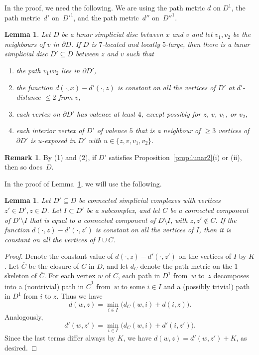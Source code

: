 \documentclass[a4paper,12pt,leqno]{amsart}
\newtheorem{lemma}[thm]{Lemma}
\theoremstyle{definition}
\newtheorem{remark}[thm]{Remark}
\begin{document}
In the proof, we need the following.  We are using the path metric $d$ on $D^{1}$, the path metric~$d'$ on~$D'^1$, and the path metric~$d''$ on~$D''^1$.

\begin{lemma} \label{lem:nice lunar diagram}
Let $D$ be a lunar simplicial disc between $x$ and $v$ and let $v_1,v_2$ be the neighbours of $v$ in $\partial D$. If $D$ is $7$-located and locally $5$-large, then there is a lunar simplicial disc $D'\subseteq D$ between $z$ and $v$ such that 
    \begin{enumerate}
          \item the path $v_1vv_2$ lies in $\partial D'$,
          \item the function $d(\cdot,x)-d'(\cdot,z)$ is constant on all the vertices of $D'$ at $d'$-distance $\leq 2$ from $v$,
        \item each vertex on $\partial D'$ has valence at least $4$, except possibly for $z$, $v$, 
        $v_1$, or $v_2$, 
               \item each interior vertex of $D'$ of valence $5$ that is a neighbour of $\geq 3$ vertices of~$\partial D'$ is $u$-exposed in $D'$ with $u\in \{z,v,v_1,v_2\}$.
     \end{enumerate}  
\end{lemma}

\begin{remark}
\label{rem:polite}
By (1) and (2), if $D'$ satisfies Proposition~\ref{prop:lunar2}(i) or (ii), then so does~$D$.
\end{remark}

In the proof of Lemma~\ref{lem:nice lunar diagram}, we will use the following.

\begin{lemma}
\label{rem:cut}
Let $D'\subseteq D$ be connected simplicial complexes with vertices $z'\in D',z\in D$. Let $I\subset D'$ be a subcomplex, and let $C$ be a connected component of $D'\setminus I$ that is equal to a connected component of $D\setminus I$, with $z,z'\notin C$. If the function $d(\cdot,z)-d'(\cdot,z')$ is constant on all the vertices of $I$, then it is constant on all the vertices of $I\cup C$. 
\end{lemma}
\begin{proof}
Denote the constant value of $d(\cdot,z)-d'(\cdot,z')$ on the vertices of $I$ by $K$. Let $\overline C$ be the closure of $C$ in $D$, and let $d_C$ denote the path metric on the $1$-skeleton of $\overline C$.
For each vertex $w$ of $C$, each path in $D^1$ from~$w$ to~$z$ decomposes into a (nontrivial) path in $\overline C^1$ from~$w$ to some $i\in I$  and a (possibly trivial) path in $D^1$ from $i$ to $z$. Thus we have $$d(w,z)=\min_{i\in I}\big(d_C(w,i)+d(i,z)\big).$$
Analogously, 
$$d'(w,z')=\min_{i\in I}\big(d_C(w,i)+d'(i,z')\big).$$
Since the last terms differ always by $K$, we have $d(w,z)=d'(w,z')+K$, as desired.
\end{proof}
\end{document}
